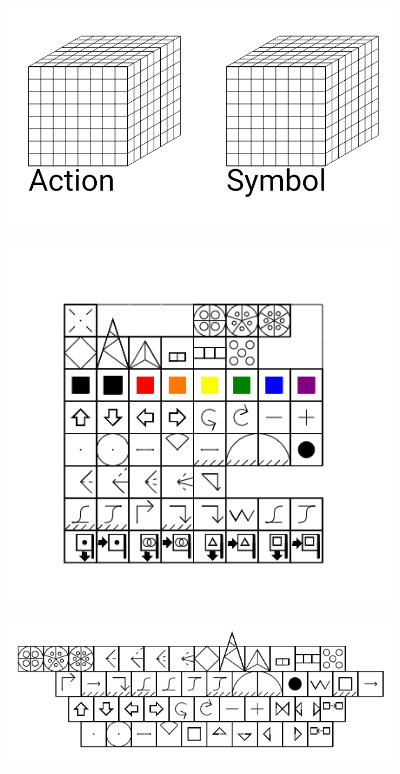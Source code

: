 \documentclass[11pt]{article}
\begin{document}
\begin{figure}[h]
\includegraphics[width=4in]{image22.png}

\caption{}
\end{figure}










\begin{figure}[h]
\includegraphics[width=4in]{image24.png}

\caption{}
\end{figure}










\begin{figure}[h]
\includegraphics[width=4in]{image26.png}

\caption{}
\end{figure}
\end{document}
